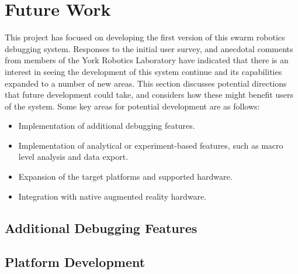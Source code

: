 
\chapter[Future Work]{Future Work} %

\label{Chapter11} %

This project has focused on developing the first version of this swarm robotics debugging system. Responses to the initial user survey, and anecdotal comments from members of the York Robotics Laboratory have indicated that there is an interest in seeing the development of this system continue and its capabilities expanded to a number of new areas. This section discusses potential directions that future development could take, and considers how these might benefit users of the system. Some key areas for potential development are as follows:

\begin{itemize}
 \item Implementation of additional debugging features.
 \item Implementation of analytical or experiment-based features, such as macro level analysis and data export.
 \item Expansion of the target platforms and supported hardware.
 \item Integration with native augmented reality hardware.
\end{itemize}


\section{Additional Debugging Features}


\section{Platform Development}

